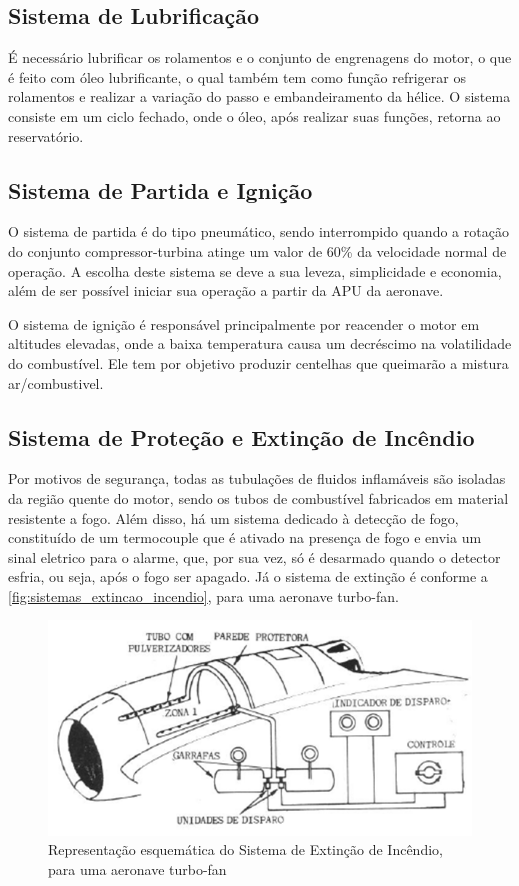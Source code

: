 \subsection{Sistema de Lubrificação}

É necessário lubrificar os rolamentos e o conjunto de engrenagens do motor, o que é feito com óleo lubrificante, o qual também tem como função refrigerar os rolamentos e realizar a variação do passo e embandeiramento da hélice.
O sistema consiste em um ciclo fechado, onde o óleo, após realizar suas funções, retorna ao reservatório.

\subsection{Sistema de Partida e Ignição}

O sistema de partida é do tipo pneumático, sendo interrompido quando a rotação do conjunto compressor-turbina atinge um valor de 60\% da velocidade normal de operação.
A escolha deste sistema se deve a sua leveza, simplicidade e economia, além de ser possível iniciar sua operação a partir da APU da aeronave.

O sistema de ignição é responsável principalmente por reacender o motor em altitudes elevadas, onde a baixa temperatura causa um decréscimo na volatilidade do combustível.
Ele tem por objetivo produzir centelhas que queimarão a mistura ar/combustivel.

\subsection{Sistema de Proteção e Extinção de Incêndio}

Por motivos de segurança, todas as tubulações de fluidos inflamáveis são isoladas da região quente do motor, sendo os tubos de combustível fabricados em material resistente a fogo.
Além disso, há um sistema dedicado à detecção de fogo, constituído de um termocouple que é ativado na presença de fogo e envia um sinal eletrico para o alarme, que, por sua vez, só é desarmado quando o detector esfria, ou seja, após o fogo ser apagado.
Já o sistema de extinção é conforme a \autoref{fig:sistemas_extincao_incendio}, para uma aeronave turbo-fan.

\begin{figure}
\includegraphics[width=\textwidth]{images/parte3/sistemas_extincao_incendio.png}
\caption{Representação esquemática do Sistema de Extinção de Incêndio, para uma aeronave turbo-fan}
\label{fig:sistemas_extincao_incendio}
\end{figure}


